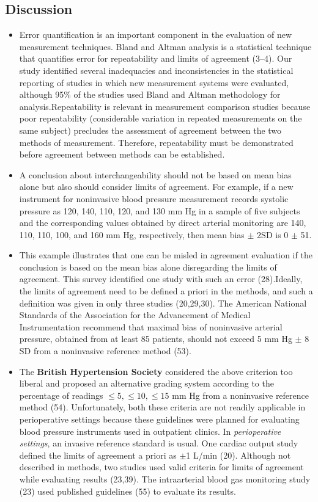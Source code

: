 \documentclass[MAIN.tex]{subfiles}
\begin{document}
	\subsection*{Discussion}
	\begin{itemize}
		\item 
		Error quantification is an important component in the evaluation of new measurement techniques. Bland and Altman analysis is a statistical technique that quantifies error for repeatability and limits of agreement (3–4). Our study identified several inadequacies and inconsistencies in the statistical reporting of studies in which new measurement systems were evaluated, although 95\% of the studies used Bland and Altman methodology for analysis.Repeatability is relevant in measurement comparison studies because poor repeatability (considerable variation in repeated measurements on the same subject) precludes the assessment of agreement between the two methods of measurement. Therefore, repeatability must be demonstrated before agreement between methods can be established.
		\item 
		A conclusion about interchangeability should not be based on mean bias alone but also should consider limits of agreement. For example, if a new instrument for noninvasive blood pressure measurement records systolic pressure as 120, 140, 110, 120, and 130 mm Hg in a sample of five subjects and the corresponding values obtained by direct arterial monitoring are 140, 110, 110, 100, and 160 mm Hg, respectively, then mean bias $\pm$ 2SD is 0 $\pm$ 51. 
		\item 
		This example illustrates that one can be misled in agreement evaluation if the conclusion is based on the mean bias alone disregarding the limits of agreement. This survey identified one study with such an error (28).Ideally, the limits of agreement need to be defined a priori in the methods, and such a definition was given in only three studies (20,29,30). The American National Standards of the Association for the Advancement of Medical Instrumentation recommend that maximal bias of noninvasive arterial pressure, obtained from at least 85 patients, should not exceed 5 mm Hg $\pm$ 8 SD from a noninvasive reference method (53). 
		\item 
		The \textbf{British Hypertension Society} considered the above criterion too liberal and proposed an alternative grading system according to the percentage of readings $\leq 5, \leq 10, \leq 15$ mm Hg from a noninvasive reference method (54). Unfortunately, both these criteria are not readily applicable in perioperative settings because these guidelines were planned for evaluating blood pressure instruments used in outpatient clinics. In\textit{ perioperative settings}, an invasive reference standard is usual. One cardiac output study defined the limits of agreement a priori as $\pm$1 L/min (20). Although not described in methods, two studies used valid criteria for limits of agreement while evaluating results (23,39). The intraarterial blood gas monitoring study (23) used published guidelines (55) to evaluate its results. 

\end{itemize}
\end{document}
